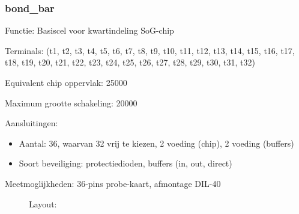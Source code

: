 \subsubsection{bond\_bar}

Functie: Basiscel voor kwartindeling SoG-chip

Terminals: (t1, t2, t3, t4, t5, t6, t7, t8, t9, t10, t11, t12, 
                  t13, t14, t15, t16, t17, t18, t19, t20, t21, t22, t23, t24, 
                  t25, t26, t27, t28, t29, t30, t31, t32)

Equivalent chip oppervlak: 25000

Maximum grootte schakeling: 20000

Aansluitingen:
\begin{itemize}
\item
Aantal: 36, waarvan 32 vrij te kiezen, 2 voeding (chip), 2 voeding (buffers)
\item
Soort beveiliging: protectiedioden, buffers (in, out, direct)
\end{itemize}

Meetmoglijkheden: 36-pins probe-kaart, afmontage DIL-40

\begin{figure}[bth]
Layout:\\

\end{figure}

\clearpage
